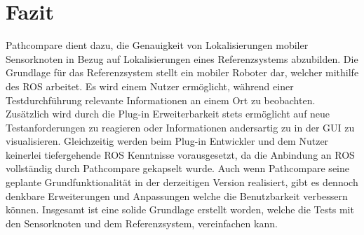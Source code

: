 \chapter{Fazit}
\label{sec:conclusion}
Pathcompare dient dazu, die Genauigkeit von Lokalisierungen mobiler
Sensorknoten in Bezug auf Lokalisierungen eines Referenzsystems abzubilden.
Die Grundlage für das Referenzsystem stellt ein mobiler Roboter dar, welcher
mithilfe des ROS arbeitet. Es wird einem Nutzer ermöglicht, während einer
Testdurchführung relevante Informationen an einem Ort zu beobachten. Zusätzlich
wird durch die Plug-in Erweiterbarkeit stets ermöglicht auf
neue Testanforderungen zu reagieren oder Informationen andersartig zu
in der GUI zu visualisieren. Gleichzeitig werden beim Plug-in Entwickler und dem Nutzer
keinerlei tiefergehende ROS Kenntnisse vorausgesetzt, da die Anbindung an ROS
vollständig durch Pathcompare gekapselt wurde. Auch wenn Pathcompare seine
geplante Grundfunktionalität in der derzeitigen Version realisiert, gibt es
dennoch denkbare Erweiterungen und Anpassungen welche die Benutzbarkeit
verbessern können. Insgesamt ist eine solide Grundlage erstellt worden, welche
die Tests mit den Sensorknoten und dem Referenzsystem, vereinfachen kann.

